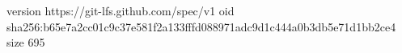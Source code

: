 version https://git-lfs.github.com/spec/v1
oid sha256:b65e7a2cc01c9c37e581f2a133fffd088971adc9d1c444a0b3db5e71d1bb2ce4
size 695
